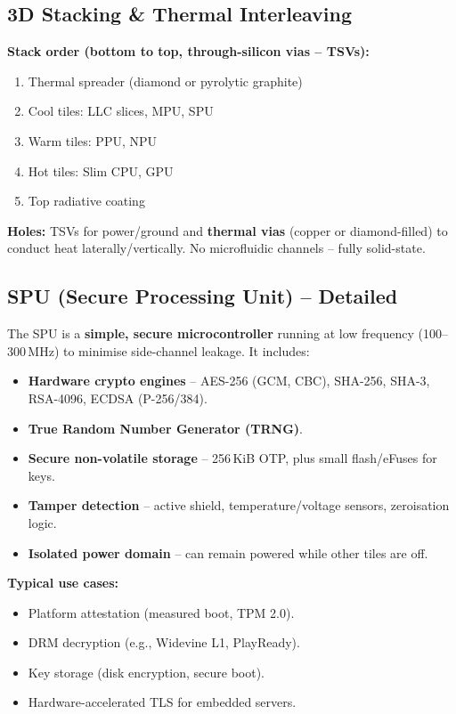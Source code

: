 \documentclass[10pt,twocolumn]{article}
\begin{document}
\subsection{3D Stacking \& Thermal Interleaving}

\textbf{Stack order (bottom to top, through-silicon vias – TSVs):}
\begin{enumerate}
\item Thermal spreader (diamond or pyrolytic graphite)
\item Cool tiles: LLC slices, MPU, SPU
\item Warm tiles: PPU, NPU
\item Hot tiles: Slim CPU, GPU
\item Top radiative coating
\end{enumerate}

\textbf{Holes:} TSVs for power/ground and \textbf{thermal vias} (copper or diamond-filled) to conduct heat laterally/vertically. No microfluidic channels – fully solid-state.

\subsection{SPU (Secure Processing Unit) – Detailed}

The SPU is a \textbf{simple, secure microcontroller} running at low frequency (100–300 MHz) to minimise side-channel leakage. It includes:
\begin{itemize}
\item \textbf{Hardware crypto engines} – AES-256 (GCM, CBC), SHA-256, SHA-3, RSA-4096, ECDSA (P-256/384).
\item \textbf{True Random Number Generator (TRNG)}.
\item \textbf{Secure non-volatile storage} – 256 KiB OTP, plus small flash/eFuses for keys.
\item \textbf{Tamper detection} – active shield, temperature/voltage sensors, zeroisation logic.
\item \textbf{Isolated power domain} – can remain powered while other tiles are off.
\end{itemize}

\textbf{Typical use cases:}
\begin{itemize}
\item Platform attestation (measured boot, TPM 2.0).
\item DRM decryption (e.g., Widevine L1, PlayReady).
\item Key storage (disk encryption, secure boot).
\item Hardware-accelerated TLS for embedded servers.
\end{itemize}
\end{document}
